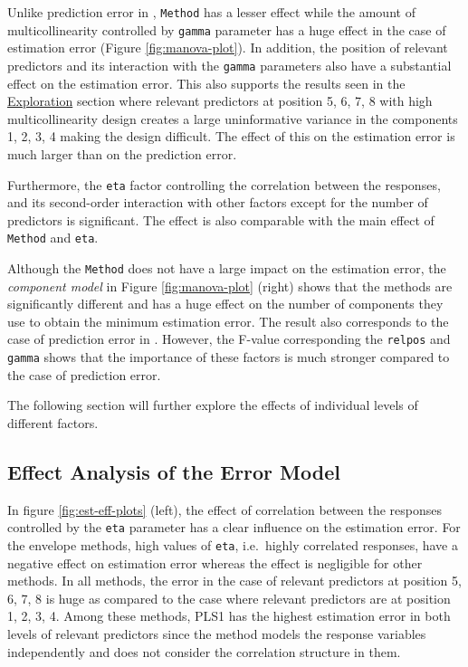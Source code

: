 \documentclass[12pt,3p,authoryear]{elsarticle}
\providecommand{\tightlist}{%
  \setlength{\itemsep}{0pt}\setlength{\parskip}{0pt}}
\begin{document}
\begin{description}
\tightlist
\item[\textbf{Error Model:}]
Unlike prediction error in \citet{rimal2019pred}, \texttt{Method} has a lesser effect while the amount of multicollinearity controlled by \texttt{gamma} parameter has a huge effect in the case of estimation error (Figure \ref{fig:manova-plot}). In addition, the position of relevant predictors and its interaction with the \texttt{gamma} parameters also have a substantial effect on the estimation error. This also supports the results seen in the \protect\hyperlink{exploration}{Exploration} section where relevant predictors at position 5, 6, 7, 8 with high multicollinearity design creates a large uninformative variance in the components 1, 2, 3, 4 making the design difficult. The effect of this on the estimation error is much larger than on the prediction error.

Furthermore, the \texttt{eta} factor controlling the correlation between the responses, and its second-order interaction with other factors except for the number of predictors is significant. The effect is also comparable with the main effect of \texttt{Method} and \texttt{eta}.
\item[\textbf{Component Model:}]
Although the \texttt{Method} does not have a large impact on the estimation error, the \emph{component model} in Figure \ref{fig:manova-plot} (right) shows that the methods are significantly different and has a huge effect on the number of components they use to obtain the minimum estimation error. The result also corresponds to the case of prediction error in \citet{rimal2019pred}. However, the F-value corresponding the \texttt{relpos} and \texttt{gamma} shows that the importance of these factors is much stronger compared to the case of prediction error.
\end{description}

The following section will further explore the effects of individual levels of different factors.

\hypertarget{effect-analysis-of-the-error-model}{%
\subsection{Effect Analysis of the Error Model}\label{effect-analysis-of-the-error-model}}

In figure \ref{fig:est-eff-plots} (left), the effect of correlation between the responses controlled by the \texttt{eta} parameter has a clear influence on the estimation error. For the envelope methods, high values of \texttt{eta}, i.e.~highly correlated responses, have a negative effect on estimation error whereas the effect is negligible for other methods. In all methods, the error in the case of relevant predictors at position 5, 6, 7, 8 is huge as compared to the case where relevant predictors are at position 1, 2, 3, 4. Among these methods, PLS1 has the highest estimation error in both levels of relevant predictors since the method models the response variables independently and does not consider the correlation structure in them.
\end{document}
